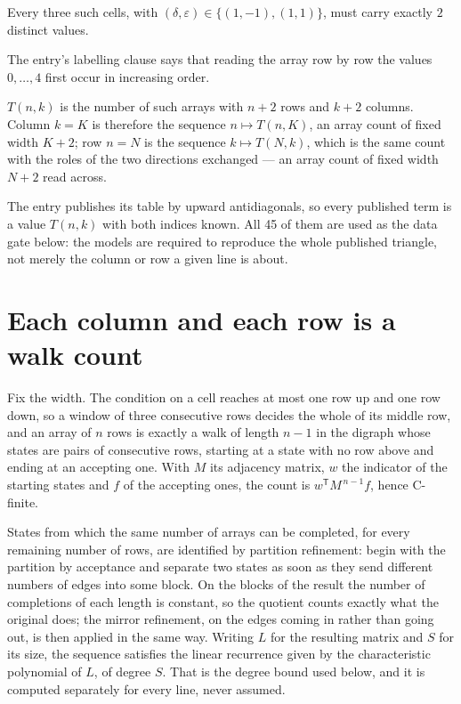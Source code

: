 \documentclass[11pt]{article}
\theoremstyle{definition}
\begin{document}
Every three such cells, with $(\delta,\varepsilon) \in \{(1,-1), (1,1)\}$, must carry exactly $2$ distinct values.

The entry's labelling clause says that reading the array row by row the values $0,\dots,4$ first occur in increasing order.

$T(n,k)$ is the number of such arrays with $n + 2$ rows and $k + 2$ columns. Column $k = K$ is therefore the sequence $n \mapsto T(n,K)$, an array count of fixed width $K + 2$; row $n = N$ is the sequence $k \mapsto T(N,k)$, which is the same count with the roles of the two directions exchanged --- an array count of fixed width $N + 2$ read across.

The entry publishes its table by upward antidiagonals, so every published term is a value $T(n,k)$ with both indices known. All 45 of them are used as the data gate below: the models are required to reproduce the whole published triangle, not merely the column or row a given line is about.

\section{Each column and each row is a walk count}

Fix the width. The condition on a cell reaches at most one row up and one row down, so a window of three consecutive rows decides the whole of its middle row, and an array of $n$ rows is exactly a walk of length $n-1$ in the digraph whose states are pairs of consecutive rows, starting at a state with no row above and ending at an accepting one. With $M$ its adjacency matrix, $w$ the indicator of the starting states and $f$ of the accepting ones, the count is $w^{\mathsf T}M^{\,n-1}f$, hence C-finite.

States from which the same number of arrays can be completed, for every remaining number of rows, are identified by partition refinement: begin with the partition by acceptance and separate two states as soon as they send different numbers of edges into some block. On the blocks of the result the number of completions of each length is constant, so the quotient counts exactly what the original does; the mirror refinement, on the edges coming in rather than going out, is then applied in the same way. Writing $L$ for the resulting matrix and $S$ for its size, the sequence satisfies the linear recurrence given by the characteristic polynomial of $L$, of degree $S$. That is the degree bound used below, and it is computed separately for every line, never assumed.
\end{document}

